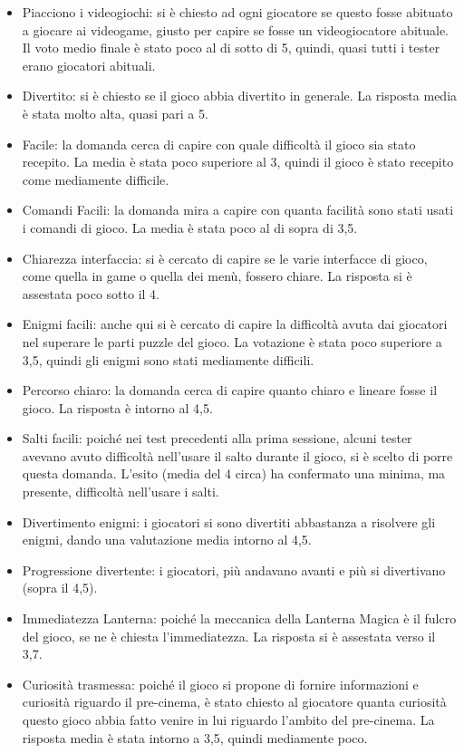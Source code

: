 \begin{itemize}

\item Piacciono i videogiochi: si è chiesto ad ogni giocatore se questo fosse abituato a giocare ai videogame, giusto per capire se fosse un videogiocatore abituale. Il voto medio finale è stato poco al di sotto di 5, quindi, quasi tutti i tester erano giocatori abituali.
\item Divertito: si è chiesto se il gioco abbia divertito in generale. La risposta media è stata molto alta, quasi pari a 5.
\item Facile: la domanda cerca di capire con quale difficoltà il gioco sia stato recepito. La media è stata poco superiore al 3, quindi il gioco è stato recepito come mediamente difficile.
\item Comandi Facili: la domanda mira a capire con quanta facilità sono stati usati i comandi di gioco. La media è stata poco al di sopra di 3,5.
\item Chiarezza interfaccia: si è cercato di capire se le varie interfacce di gioco, come quella in game o quella dei menù, fossero chiare. La risposta si è assestata poco sotto il 4.
\item Enigmi facili: anche qui si è cercato di capire la difficoltà avuta dai giocatori nel superare le parti puzzle del gioco. La votazione è stata poco superiore a 3,5, quindi gli enigmi sono stati mediamente difficili.
\item Percorso chiaro:  la domanda cerca di capire quanto chiaro e lineare fosse il gioco. La risposta è intorno al 4,5.
\item Salti facili: poiché nei test precedenti alla prima sessione, alcuni tester avevano avuto difficoltà nell'usare il salto durante il gioco, si è scelto di porre questa domanda. L'esito (media del 4 circa) ha confermato una minima, ma presente, difficoltà nell'usare i salti. 
\item Divertimento enigmi: i giocatori si sono divertiti abbastanza a risolvere gli enigmi, dando una valutazione media intorno al 4,5.
\item Progressione divertente: i giocatori, più andavano avanti e più si divertivano (sopra il 4,5).
\item Immediatezza Lanterna: poiché la meccanica della Lanterna Magica è il fulcro del gioco, se ne è chiesta l'immediatezza. La risposta si è assestata verso il 3,7.
\item Curiosità trasmessa: poiché il gioco si propone di fornire informazioni e curiosità riguardo il pre-cinema, è stato chiesto al giocatore quanta curiosità questo gioco abbia fatto venire in lui riguardo l'ambito del pre-cinema. La risposta media è stata intorno a 3,5, quindi mediamente poco.

\end{itemize}
